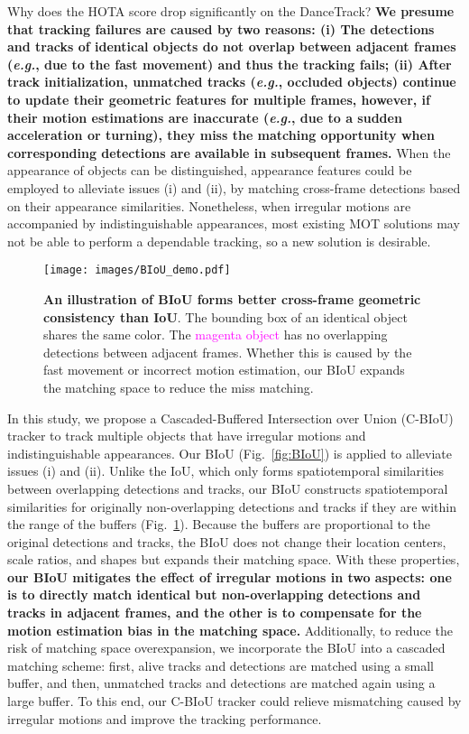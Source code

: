 \documentclass[journal]{IEEEtran}
\newcommand{\eg}{{\it e.g.}}
\begin{document}
Why does the HOTA score drop significantly on the DanceTrack? \textbf{We presume that tracking failures are caused by two reasons: 
(i) The detections and tracks of identical objects do not overlap between adjacent frames (\eg, due to the fast movement) and thus the tracking fails; (ii) After track initialization, unmatched tracks (\eg, occluded objects) continue to update their geometric features for multiple frames, however, if their motion estimations are inaccurate (\eg, due to a sudden acceleration or turning), they miss the matching opportunity when corresponding detections are available in subsequent  frames.} When the appearance of objects can be distinguished, appearance features could be employed to alleviate issues (i) and (ii), by matching cross-frame detections based on their appearance similarities. Nonetheless, when irregular motions are accompanied by indistinguishable appearances, most existing MOT solutions may not be able to perform a dependable tracking, so a new solution is desirable.

\begin{figure}[t!]
   \centering
   \texttt{[image: images/BIoU\_demo.pdf]}
   \caption{\textbf{An illustration of BIoU forms better cross-frame geometric consistency than IoU}. The bounding box of an identical object shares the same color. The \textcolor{magenta}{magenta object} has no overlapping detections between adjacent frames. Whether this is caused by the fast movement or incorrect motion estimation, our BIoU expands the matching space to reduce the miss matching.}
   \label{fig:BIoU_demo}
\end{figure}

In this study, we propose a Cascaded-Buffered Intersection over Union (C-BIoU) tracker to track multiple objects that have irregular motions and indistinguishable appearances. Our BIoU (Fig.~\ref{fig:BIoU}) is applied to alleviate issues (i) and (ii). Unlike the IoU, which only forms spatiotemporal similarities between overlapping detections and tracks, our BIoU constructs spatiotemporal similarities for originally non-overlapping detections and tracks if they are within the range of the buffers (Fig.~\ref{fig:BIoU_demo}). Because the buffers are proportional to the original detections and tracks, the BIoU does not change their location centers, scale ratios, and shapes but expands their matching space. With these properties, \textbf{our BIoU mitigates the effect of irregular motions in two aspects: one is to directly match identical but non-overlapping detections and tracks in adjacent frames, and the other is to compensate for the motion estimation bias in the matching space.} Additionally, to reduce the risk of matching space overexpansion, we incorporate the BIoU into a cascaded matching scheme: first, alive tracks and detections are matched using a small buffer, and then, unmatched tracks and detections are matched again using a large buffer. To this end, our C-BIoU tracker could relieve mismatching caused by irregular motions and improve the tracking performance. 
\end{document}

